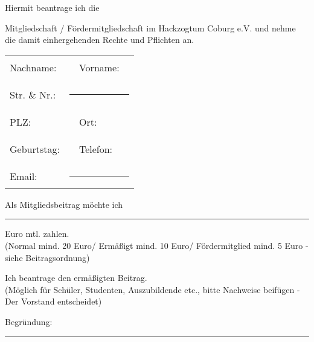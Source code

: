 Hiermit beantrage ich die\\ 

\vspace{-.3cm}

	\fbox{\textcolor{white}{0}} Mitgliedschaft / \fbox{\textcolor{white}{0}} Fördermitgliedschaft im Hackzogtum Coburg e.V. und nehme die damit einhergehenden Rechte und Pflichten an.

\begin{tabular}{llll}
	Nachname: & \rule{5cm}{.3pt} & Vorname: & \rule{5cm}{.3pt} \\
	\\
	{Str. \& Nr.:} & \multicolumn{3}{l}{\rule{12.35cm}{.3pt}}\\
	\\
	PLZ: & \rule{5cm}{.3pt} & Ort: & \rule{5cm}{.3pt} \\
	\\
	Geburtstag: & \rule{5cm}{.3pt} & Telefon: & \rule{5cm}{.3pt} \\
	\\
	{Email:} & \multicolumn{3}{l}{\rule{12.35cm}{.3pt}}\\
\end{tabular} 
	
	Als Mitgliedsbeitrag möchte ich {\rule{1cm}{.3pt}} Euro mtl. zahlen. \\
	\small(Normal mind. 20 Euro/ Ermäßigt mind. 10 Euro/ Fördermitglied mind. 5 Euro - siehe Beitragsordnung) \normalsize
	
	\fbox{\textcolor{white}{0}} \quad Ich beantrage den ermäßigten Beitrag. \\
	\small(Möglich für Schüler, Studenten, Auszubildende etc., bitte Nachweise beifügen - Der Vorstand entscheidet) \\
	\vspace{-0.4cm}
  
{Begründung:} {\rule{12.35cm}{.3pt}}

